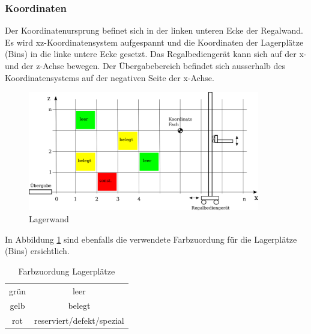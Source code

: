 \subsubsection{Koordinaten}
Der Koordinatenursprung befinet sich in der linken unteren Ecke der Regalwand. Es wird xz-Koordinatensystem aufgespannt und die Koordinaten der Lagerplätze (Bins) in die linke untere Ecke gesetzt. Das Regalbediengerät kann sich auf der x- und der z-Achse bewegen. Der Übergabebereich befindet sich ausserhalb des Koordinatensystems auf der negativen Seite der x-Achse. 
%
\begin{figure}[h]
  \begin{center}
    \includegraphics[width=0.9\textwidth]{images/koordinaten-wand.png}
    \caption{Lagerwand}
    \label{fig:wand}
  \end{center}
\end{figure}
%
In Abbildung \ref{fig:wand} sind ebenfalls die verwendete Farbzuordung für die Lagerplätze (Bins) ersichtlich.
%
\begin{table}
  \caption{Farbzuordung Lagerplätze}
  \label{tab:bin-color}

  \begin{center}
    \begin{tabular}{cc}
       grün & leer\\
       gelb & belegt\\
       rot & reserviert/defekt/spezial \\
    \end{tabular}
  \end{center}
\end{table}

%
